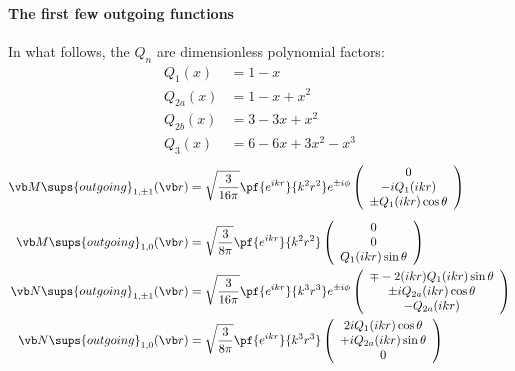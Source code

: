 \documentclass[letterpaper]{article}
\begin{document}
\paragraph{The first few outgoing functions}

In what follows, the $Q_n$ are dimensionless polynomial factors:
\begin{align*}
 Q_1(x) &= 1-x \\
 Q_{2a}(x) &= 1-x+x^2 \\
 Q_{2b}(x) &= 3-3x+x^2 \\
 Q_3(x) &= 6-6x+3x^2-x^3
\end{align*}
\begin{align*}
 \vb M\sups{outgoing}_{1,\pm 1}(\vb r)
  &=\sqrt\frac{3}{16\pi}\pf{e^{ikr}}{k^2 r^2} e^{\pm i\phi}
    \left(\begin{array}{c}
    0          \\
    -iQ_1(ikr) \\
    \pm Q_1(ikr) \cos\theta 
    \end{array}\right)
\\[5pt]
 \vb M\sups{outgoing}_{1,0}(\vb r)
  &=\sqrt\frac{3}{8\pi}\pf{e^{ikr}}{k^2 r^2}
    \left(\begin{array}{c}
    0       \\
    0       \\
    Q_1(ikr) \sin\theta 
    \end{array}\right)
\\
 \vb N\sups{outgoing}_{1,\pm 1}(\vb r)
  &=\sqrt\frac{3}{16\pi}\pf{e^{ikr}}{k^3 r^3} e^{\pm i\phi}
    \left(\begin{array}{c}
    \mp -2(ikr)Q_1(ikr)\sin \theta   \\
    \pm iQ_{2a}(ikr) \cos\theta      \\
    -Q_{2a}(ikr)
    \end{array}\right)
\\
 \vb N\sups{outgoing}_{1,0}(\vb r)
  &=\sqrt\frac{3}{8\pi}\pf{e^{ikr}}{k^3 r^3}
    \left(\begin{array}{c}
    2iQ_1(ikr)\cos \theta		\\
    +iQ_{2a}(ikr)\sin\theta	\\
    0
    \end{array}\right)

\end{align*}
\end{document}
